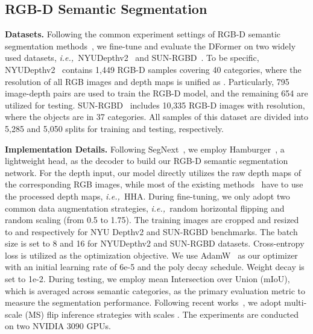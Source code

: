 \documentclass{article}
\newcommand{\myPara}[1]{\vspace{5pt}\noindent\textbf{#1}}
\def\ie{\emph{i.e.,~}}
\newcommand{\nMethod}{DFormer}
\begin{document}
\subsection{RGB-D Semantic Segmentation}\label{sec:exp_seg}






\myPara{Datasets.}
Following the common experiment settings of RGB-D semantic segmentation methods~\citep{xie2021segformer,guo2022segnext}, we fine-tune and evaluate the \nMethod{} on two widely used datasets, \ie NYUDepthv2~\citep{silberman2012nyu_dataset} and SUN-RGBD~\citep{song2015sun_rgbd}.
To be specific, NYUDepthv2~\citep{silberman2012nyu_dataset} contains 1,449 RGB-D samples covering 40 categories, where the resolution of all RGB images and depth maps is unified as . 
Particularly, 795 image-depth pairs are used to train the RGB-D model, and the remaining 654 are utilized for testing. 
SUN-RGBD~\citep{song2015sun_rgbd} includes 10,335 RGB-D images with  resolution, where the objects are in 37 categories. 
All samples of this dataset are divided into 5,285 and 5,050 splits for training and testing, respectively.






\myPara{Implementation Details.}
Following SegNext~\cite{guo2022segnext}, we employ Hamburger~\citep{geng2021attention}, a lightweight head, as the decoder to build our RGB-D semantic segmentation network.
For the depth input, our model directly utilizes the raw depth maps of the corresponding RGB images, while most of the existing methods~\citep{chen2020sa_gate,zhang2022cmx} have to use the processed depth maps, \ie HHA.
During fine-tuning, we only adopt two common data augmentation strategies, \ie random horizontal flipping and random scaling (from 0.5 to 1.75).
The training images are cropped and resized to  and  respectively for NYU Depthv2 and SUN-RGBD benchmarks. The batch size is set to 8 and 16 for NYUDepthv2 and SUN-RGBD datasets.
Cross-entropy loss is utilized as the optimization objective.
We use AdamW~\citep{kingma2014adam} as our optimizer with an initial learning rate of 6e-5 and the poly decay schedule. 
Weight decay is set to 1e-2.
During testing, we employ mean Intersection over Union (mIoU), which is averaged across semantic categories, as the primary evaluation metric to measure the segmentation performance. 
Following recent works~\citep{zhang2022cmx,wang2022multimodal,zhang2023delivering}, we adopt multi-scale (MS) flip inference strategies with scales .
The experiments are conducted on two NVIDIA 3090 GPUs.
\end{document}
